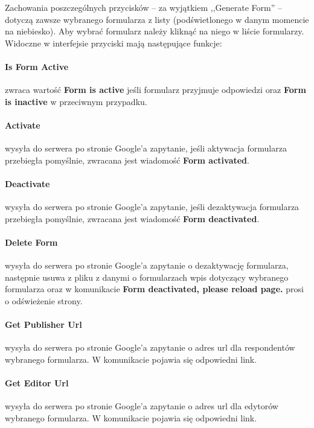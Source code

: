 \ind Zachowania poszczególnych przycisków  -- za wyjątkiem ,,Generate Form'' -- dotyczą zawsze wybranego formularza z listy (podświetlonego w danym momencie na niebiesko). Aby wybrać formularz należy kliknąć na niego w liście formularzy. 
\ind Widoczne w interfejsie przyciski mają następujące funkcje:
\paragraph{Is Form Active} zwraca wartość \textbf{Form is active} jeśli formularz przyjmuje odpowiedzi oraz \textbf{Form is inactive} w przeciwnym przypadku.
\paragraph{Activate} wysyła do serwera po stronie Google'a zapytanie, jeśli aktywacja formularza przebiegła pomyślnie, zwracana jest wiadomość \textbf{Form activated}.
\paragraph{Deactivate} wysyła do serwera po stronie Google'a zapytanie, jeśli dezaktywacja formularza przebiegła pomyślnie, zwracana jest wiadomość \textbf{Form deactivated}.
\paragraph{Delete Form} wysyła do serwera po stronie Google'a zapytanie o dezaktywację formularza, następnie usuwa z pliku z danymi o formularzach wpis dotyczący wybranego formularza oraz w komunikacie \textbf{Form deactivated, please reload page.} prosi o odświeżenie strony.
\paragraph{Get Publisher Url} wysyła do serwera po stronie Google'a zapytanie o adres url dla respondentów wybranego formularza. W komunikacie pojawia się odpowiedni link.
\paragraph{Get Editor Url} wysyła do serwera po stronie Google'a zapytanie o adres url dla edytorów wybranego formularza. W komunikacie pojawia się odpowiedni link.



